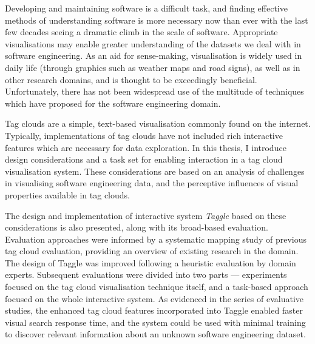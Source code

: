 


\begin{abstracts}        %

Developing and maintaining software is a difficult task, and finding effective methods of understanding software is more necessary now than ever with the last few decades seeing a dramatic climb in the scale of software. Appropriate visualisations may enable greater understanding of the datasets we deal with in software engineering. As an aid for sense-making, visualisation is widely used in daily life (through graphics such as weather maps and road signs), as well as in other research domains, and is thought to be exceedingly beneficial. Unfortunately, there has not been widespread use of the multitude of techniques which have proposed for the software engineering domain.

Tag clouds are a simple, text-based visualisation commonly found on the internet. Typically, implementations of tag clouds have not included rich interactive features which are necessary for data exploration. In this thesis, I introduce design considerations and a task set for enabling interaction in a tag cloud visualisation system. These considerations are based on an analysis of challenges in visualising software engineering data, and the perceptive influences of visual properties available in tag clouds. 

The design and implementation of interactive system \emph{Taggle} based on these considerations is also presented, along with its broad-based evaluation. Evaluation approaches were informed by a systematic mapping study of previous tag cloud evaluation, providing an overview of existing research in the domain. The design of Taggle was improved following a heuristic evaluation by domain experts. Subsequent evaluations were divided into two parts --- experiments focused on the tag cloud visualisation technique itself, and a task-based approach focused on the whole interactive system. As evidenced in the series of evaluative studies, the enhanced tag cloud features incorporated into Taggle enabled faster visual search response time, and the system could be used with minimal training to discover relevant information about an unknown software engineering dataset.
\end{abstracts}




